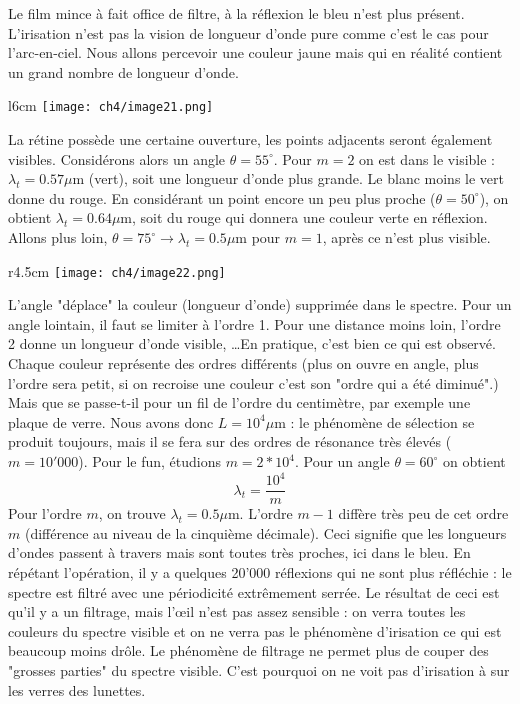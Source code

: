 Le film mince à fait office de filtre, à la réflexion le bleu n'est plus présent. L'irisation n'est 
pas la vision de longueur d'onde pure comme c'est le cas pour l'arc-en-ciel. Nous allons percevoir 
une couleur jaune mais qui en réalité contient un grand nombre de longueur d'onde.\\

	\begin{wrapfigure}[8]{l}{6cm}
	\vspace{-5mm}
	\texttt{[image: ch4/image21.png]}
	\end{wrapfigure}
La rétine possède une certaine ouverture, les points adjacents seront également visibles. Considérons 
alors un angle $\theta = 55^\circ$. Pour $m=2$ on est dans le visible : $\lambda_t=0.57\mu$m (vert), 
soit une longueur d'onde plus grande. Le blanc moins le vert donne du rouge. En considérant un point 
encore un peu plus proche ($\theta =50^\circ$), on obtient $\lambda_t = 0.64\mu$m, soit du rouge qui 
donnera une couleur verte en réflexion. Allons plus loin, $\theta = 75^\circ\rightarrow \lambda_t = 0.5
\mu$m pour $m=1$, après ce n'est plus visible. \\

	\begin{wrapfigure}[15]{r}{4.5cm}
	\vspace{-5mm}
	\texttt{[image: ch4/image22.png]}
	\end{wrapfigure}
L'angle "déplace" la couleur (longueur d'onde) supprimée dans le spectre. Pour un angle lointain, il faut se limiter 
à l'ordre 1. Pour une distance moins loin, l'ordre 2 donne un longueur d'onde visible, \dots En 
pratique, c'est bien ce qui est observé. Chaque couleur représente des ordres différents (plus on 
ouvre en angle, plus l'ordre sera petit, si on recroise une couleur c'est son "ordre qui a été 
diminué".)\\

Mais que se passe-t-il pour un fil de l'ordre du centimètre, par exemple une plaque de verre. Nous 
avons donc $L=10^4\mu$m : le phénomène de sélection se produit toujours, mais il se fera sur des 
ordres de résonance très élevés ($m=10'000$). Pour le fun, étudions $m=2*10^4$. Pour un angle 
$\theta=60^\circ$ on obtient
\begin{equation}
\lambda_t = \frac{10^4}{m}
\end{equation}
Pour l'ordre $m$, on trouve $\lambda_t = 0.5\mu$m. L'ordre $m-1$ diffère très peu de cet ordre $m$ 
(différence au niveau de la cinquième décimale). Ceci signifie que les longueurs d'ondes passent 
à travers mais sont toutes très proches, ici dans le bleu. En répétant l'opération, il y a quelques 
20'000 réflexions qui ne sont plus réfléchie : le spectre est filtré avec une périodicité extrêmement 
serrée. Le résultat de ceci est qu'il y a un filtrage, mais l’œil n'est pas assez sensible : on 
verra toutes les couleurs du spectre visible et on ne verra pas le phénomène d'irisation ce qui est 
beaucoup moins drôle. Le phénomène de filtrage ne permet plus de couper des "grosses parties" du 
spectre visible. C'est pourquoi on ne voit pas d’irisation à sur les verres des lunettes.\\

